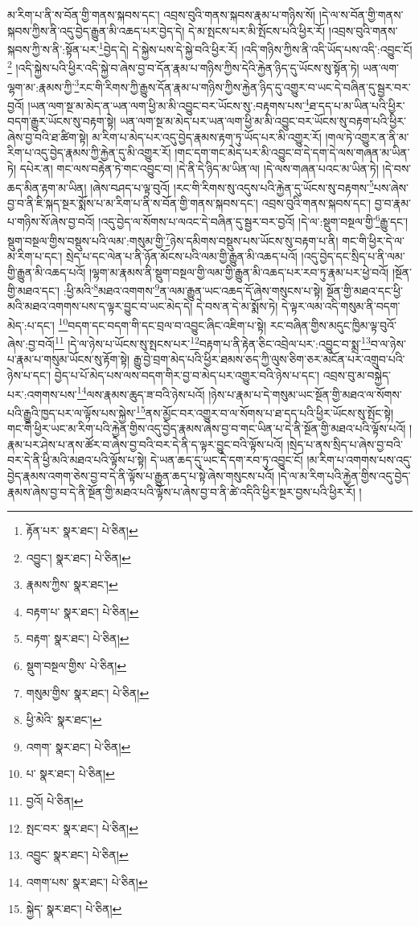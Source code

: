 མ་རིག་པ་ནི་ས་བོན་གྱི་གནས་སྐབས་དང་། འབྲས་བུའི་གནས་སྐབས་རྣམ་པ་གཉིས་སོ། །དེ་ལ་ས་བོན་གྱི་གནས་སྐབས་ཀྱིས་ནི་འདུ་བྱེད་རྒྱུན་མི་འཆད་པར་བྱེད་དེ། དེ་མ་སྤངས་པར་མི་སྤོངས་པའི་ཕྱིར་རོ། །འབྲས་བུའི་གནས་སྐབས་ཀྱི་ས་ནི་:སྟོན་པར་\footnote{རྟོན་པར་  སྣར་ཐང་།  པེ་ཅིན། }བྱེད་དེ། དེ་སྐྱེས་པས་དེ་སྐྱེ་བའི་ཕྱིར་རོ། །འདི་གཉིས་ཀྱིས་ནི་འདི་ཡོད་པས་འདི་:འབྱུང་ངོ།\footnote{འབྱུང་།  སྣར་ཐང་།  པེ་ཅིན། } །འདི་སྐྱེས་པའི་ཕྱིར་འདི་སྐྱེ་བ་ཞེས་བྱ་བ་དོན་རྣམ་པ་གཉིས་ཀྱིས་དེའི་རྐྱེན་ཉིད་དུ་ཡོངས་སུ་སྟོན་ཏེ། ཡན་ལག་ལྷག་མ་:རྣམས་ཀྱི་\footnote{རྣམས་ཀྱིས་  སྣར་ཐང་། }རང་གི་རིགས་ཀྱི་རྒྱུས་དོན་རྣམ་པ་གཉིས་ཀྱིས་རྐྱེན་ཉིད་དུ་འགྱུར་བ་ཡང་དེ་བཞིན་དུ་སྦྱར་བར་བྱའོ། །ཡན་ལག་སྔ་མ་མེད་ན་ཡན་ལག་ཕྱི་མ་མི་འབྱུང་བར་ཡོངས་སུ་:བརྟགས་པས་\footnote{བརྟག་པ་  སྣར་ཐང་།  པེ་ཅིན། }ཐ་དད་པ་མ་ཡིན་པའི་ཕྱིར་བདག་རྒྱུར་ཡོངས་སུ་བརྟག་སྟེ། ཡན་ལག་སྔ་མ་མེད་པར་ཡན་ལག་ཕྱི་མ་མི་འབྱུང་བར་ཡོངས་སུ་བརྟག་པའི་ཕྱིར་ཞེས་བྱ་བའི་ཐ་ཚིག་སྟེ། མ་རིག་པ་མེད་པར་འདུ་བྱེད་རྣམས་རྟག་ཏུ་ཡོད་པར་མི་འགྱུར་རོ། །གལ་ཏེ་འགྱུར་ན་ནི་མ་རིག་པ་འདུ་བྱེད་རྣམས་ཀྱི་རྐྱེན་དུ་མི་འགྱུར་རོ། །གང་དག་གང་མེད་པར་མི་འབྱུང་བ་དེ་དག་དེ་ལས་གཞན་མ་ཡིན་ཏེ། དཔེར་ན། གང་ལས་བརྟེན་ཏེ་གང་འབྱུང་བ། །དེ་ནི་དེ་ཉིད་མ་ཡིན་ལ། །དེ་ལས་གཞན་པའང་མ་ཡིན་ཏེ། །དེ་བས་ཆད་མིན་རྟག་མ་ཡིན། །ཞེས་བཤད་པ་ལྟ་བུའོ། །རང་གི་རིགས་སུ་འདུས་པའི་རྐྱེན་དུ་ཡོངས་སུ་བརྟགས་\footnote{བརྟག་  སྣར་ཐང་།  པེ་ཅིན། }པས་ཞེས་བྱ་བ་ནི་ཇི་སྐད་སྔར་སྨོས་པ་མ་རིག་པ་ནི་ས་བོན་གྱི་གནས་སྐབས་དང་། འབྲས་བུའི་གནས་སྐབས་དང་། བྱ་བ་རྣམ་པ་གཉིས་སོ་ཞེས་བྱ་བའོ། །འདུ་བྱེད་ལ་སོགས་པ་ལའང་དེ་བཞིན་དུ་སྦྱར་བར་བྱའོ། །དེ་ལ་:སྡུག་བསྔལ་གྱི་\footnote{སྡུག་བསྔལ་གྱིས་  པེ་ཅིན། }རྒྱུ་དང་། སྡུག་བསྔལ་གྱིས་བསྡུས་པའི་ལམ་:གསུམ་གྱི་\footnote{གསུམ་གྱིས་  སྣར་ཐང་།  པེ་ཅིན། }ཉེས་དམིགས་བསྡུས་པས་ཡོངས་སུ་བརྟག་པ་ནི། གང་གི་ཕྱིར་དེ་ལ་མ་རིག་པ་དང་། སྲེད་པ་དང་ལེན་པ་ནི་ཉོན་མོངས་པའི་ལམ་གྱི་རྒྱུན་མི་འཆད་པའོ། །འདུ་བྱེད་དང་སྲིད་པ་ནི་ལམ་གྱི་རྒྱུན་མི་འཆད་པའོ། །ལྷག་མ་རྣམས་ནི་སྡུག་བསྔལ་གྱི་ལམ་གྱི་རྒྱུན་མི་འཆད་པར་རབ་ཏུ་རྣམ་པར་ཕྱེ་བའོ། །སྔོན་གྱི་མཐའ་དང་། :ཕྱི་མའི་\footnote{ཕྱི་མེའི་  སྣར་ཐང་། }མཐའ་འགགས་\footnote{འགག་  སྣར་ཐང་།  པེ་ཅིན། }ན་ལམ་རྒྱུན་ཡང་འཆད་དོ་ཞེས་གསུངས་པ་སྟེ། སྔོན་གྱི་མཐའ་དང་ཕྱི་མའི་མཐའ་འགགས་པས་ད་ལྟར་བྱུང་བ་ཡང་མེད་དེ། དེ་བས་ན་དེ་མ་སྨོས་ཏེ། དེ་ལྟར་ལམ་འདི་གསུམ་ནི་བདག་མེད་:པ་དང་། \footnote{པ་  སྣར་ཐང་།  པེ་ཅིན། }བདག་དང་བདག་གི་དང་བྲལ་བ་འབྱུང་ཞིང་འཇིག་པ་སྟེ། རང་བཞིན་གྱིས་མདུང་ཁྱིམ་ལྟ་བུའོ་ཞེས་:བྱ་བའོ།\footnote{བྱའོ།  པེ་ཅིན། } །དེ་ལ་ཉེས་པ་ཡོངས་སུ་སྤངས་པར་\footnote{སྤང་བར་  སྣར་ཐང་།  པེ་ཅིན། }བརྟག་པ་ནི་རྟེན་ཅིང་འབྲེལ་པར་:འབྱུང་བ་སྨྲ་\footnote{འབྱུང་  སྣར་ཐང་།  པེ་ཅིན། }བ་ལ་ཉེས་པ་རྣམ་པ་གསུམ་ཡོངས་སུ་རྟོག་སྟེ། རྒྱུ་བྱེ་བྲག་མེད་པའི་ཕྱིར་ཐམས་ཅད་ཀྱི་ལུས་ཅིག་ཅར་མངོན་པར་འགྲུབ་པའི་ཉེས་པ་དང་། བྱེད་པ་པོ་མེད་པས་ལས་བདག་གིར་བྱ་བ་མེད་པར་འགྱུར་བའི་ཉེས་པ་དང་། འབྲས་བུ་མ་བསྐྱེད་པར་:འགགས་པས་\footnote{འགག་པས་  སྣར་ཐང་།  པེ་ཅིན། }ལས་རྣམས་ཆུད་ཟ་བའི་ཉེས་པའོ། །ཉེས་པ་རྣམ་པ་དེ་གསུམ་ཡང་སྔོན་གྱི་མཐའ་ལ་སོགས་པའི་རྒྱུའི་ཁྱད་པར་ལ་ལྟོས་པས་སྐྱེས་\footnote{སྐྱེད་  སྣར་ཐང་།  པེ་ཅིན། }ནས་མྱོང་བར་འགྱུར་བ་ལ་སོགས་པ་ཐ་དད་པའི་ཕྱིར་ཡོངས་སུ་སྤོང་སྟེ། གང་གི་ཕྱིར་ཡང་མ་རིག་པའི་རྐྱེན་གྱིས་འདུ་བྱེད་རྣམས་ཞེས་བྱ་བ་གང་ཡིན་པ་དེ་ནི་སྔོན་གྱི་མཐའ་པའི་ལྟོས་པའོ། །རྣམ་པར་ཤེས་པ་ནས་ཚོར་བ་ཞེས་བྱ་བའི་བར་དེ་ནི་ད་ལྟར་བྱུང་བའི་ལྟོས་པའོ། །སྲེད་པ་ནས་སྲིད་པ་ཞེས་བྱ་བའི་བར་དེ་ནི་ཕྱི་མའི་མཐའ་པའི་ལྟོས་པ་སྟེ། དེ་ཡན་ཆད་དུ་ཡང་དེ་དག་རབ་ཏུ་འབྱུང་ངོ། །མ་རིག་པ་འགགས་པས་འདུ་བྱེད་རྣམས་འགག་ཅེས་བྱ་བ་དེ་ནི་ལྟོས་པ་རྒྱུན་ཆད་པ་སྟེ་ཞེས་གསུངས་པའོ། །དེ་ལ་མ་རིག་པའི་རྐྱེན་གྱིས་འདུ་བྱེད་རྣམས་ཞེས་བྱ་བ་དེ་ནི་སྔོན་གྱི་མཐའ་པའི་ལྟོས་པ་ཞེས་བྱ་བ་ནི་ཚེ་འདིའི་ཕྱིར་སྔར་བྱས་པའི་ཕྱིར་རོ། །
